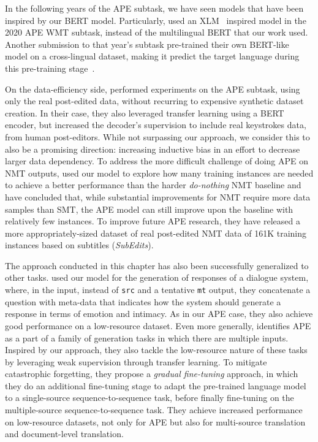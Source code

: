 In the following years of the APE subtask, we have seen models that
have been inspired by our BERT model. Particularly,
\citet{lee2020POSTECHETRISubmissionWMT2020} used an
XLM~\citep{lample2019xlm} inspired model in the 2020 APE WMT subtask,
instead of the multilingual BERT that our work used. Another
submission to that year's subtask pre-trained their own BERT-like
model on a cross-lingual dataset, making it predict the target
language during this pre-training
stage~\citep{wang2020AlibabaSubmissionWMT}.

On the data-efficiency side,
\citet{gois2020LearningNonMonotonicAutomatic} performed
experiments on the APE subtask, using only the real post-edited data,
without recurring to expensive synthetic dataset creation. In their
case, they also leveraged transfer learning using a BERT encoder, but
increased the decoder's supervision to include real keystrokes data,
from human post-editors. While not surpassing our approach, we
consider this to also be a promising direction: increasing inductive
bias in an effort to decrease larger data dependency. To address the
more difficult challenge of doing APE on NMT outputs,
\citet{chollampatt2020CanAutomaticPostEditing} used our model to
explore how many training instances are needed to achieve a better
performance than the harder \emph{do-nothing} NMT baseline and have
concluded that, while substantial improvements for NMT require more
data samples than SMT, the APE model can still improve upon the
baseline with relatively few instances. To improve future
APE research, they have released a more appropriately-sized dataset
of real post-edited NMT data of 161K training instances based on
subtitles (\emph{SubEdits}).

The approach conducted in this chapter has also been successfully
generalized to other tasks. \citet{kodama2020GeneratingResponsesthat}
used our model for the generation of responses of a dialogue system,
where, in the input, instead of \texttt{src} and a tentative
\texttt{mt} output, they concatenate a question with meta-data that
indicates how the system should generate a response in terms of
emotion and intimacy. As in our APE case, they also achieve good
performance on a low-resource dataset. Even more generally,
\citet{huang2021TransferLearningSequence} identifies APE as a part of
a family of generation tasks in which there are multiple inputs.
Inspired by our approach, they also tackle the low-resource nature of
these tasks by leveraging weak supervision through transfer learning.
To mitigate catastrophic forgetting, they propose a \emph{gradual
    fine-tuning} approach, in which they do an additional fine-tuning
stage to adapt the pre-trained language model to a single-source
sequence-to-sequence task, before finally fine-tuning on the
multiple-source sequence-to-sequence task. They achieve increased
performance on low-resource datasets, not only for APE but also for
multi-source translation and document-level translation.

